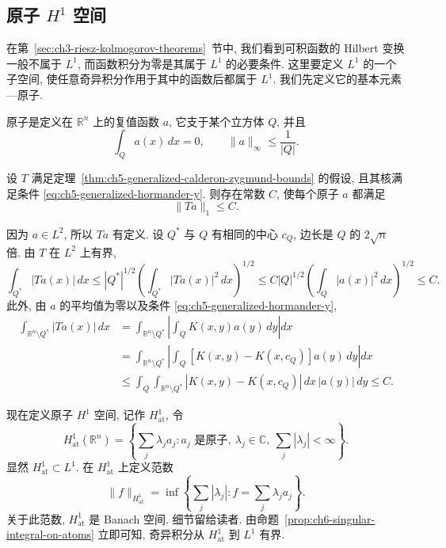 \hypertarget{chapter-06-page-127}{}
\subsection{原子 $H^1$ 空间}
\label{sec:ch6-atomic-h1}

在第~\ref{sec:ch3-riesz-kolmogorov-theorems}~节中, 我们看到可积函数的 Hilbert 变换一般不属于 $L^1$, 而函数积分为零是其属于 $L^1$ 的必要条件. 这里要定义 $L^1$ 的一个子空间, 使任意奇异积分作用于其中的函数后都属于 $L^1$. 我们先定义它的基本元素---原子.

\begin{Definition}
\label{def:ch6-atom}
原子是定义在 $\mathbb R^n$ 上的复值函数 $a$, 它支于某个立方体 $Q$, 并且
\[
 \int_Qa(x)\,dx=0,
 \qquad
 \|a\|_\infty\le\frac1{|Q|}.
\]
\end{Definition}

\begin{Proposition}
\label{prop:ch6-singular-integral-on-atoms}
设 $T$ 满足定理~\ref{thm:ch5-generalized-calderon-zygmund-bounds} 的假设, 且其核满足条件 \eqref{eq:ch5-generalized-hormander-y}. 则存在常数 $C$, 使每个原子 $a$ 都满足
\[
 \|Ta\|_1\le C.
\]
\end{Proposition}

\begin{Proof}
因为 $a\in L^2$, 所以 $Ta$ 有定义. 设 $Q^*$ 与 $Q$ 有相同的中心 $c_Q$, 边长是 $Q$ 的 $2\sqrt n$ 倍. 由 $T$ 在 $L^2$ 上有界,
\[
 \int_{Q^*}|Ta(x)|\,dx
 \le |Q^*|^{1/2}\left(\int_{Q^*}|Ta(x)|^2\,dx\right)^{1/2}
 \le C|Q|^{1/2}\left(\int_Q|a(x)|^2\,dx\right)^{1/2}
 \le C.
\]
此外, 由 $a$ 的平均值为零以及条件 \eqref{eq:ch5-generalized-hormander-y},
\[
\begin{aligned}
 \int_{\mathbb R^n\setminus Q^*}|Ta(x)|\,dx
 &=\int_{\mathbb R^n\setminus Q^*}
   \left|\int_QK(x,y)a(y)\,dy\right|dx\\
 &=\int_{\mathbb R^n\setminus Q^*}
   \left|\int_Q[K(x,y)-K(x,c_Q)]a(y)\,dy\right|dx\\
 &\le\int_Q\int_{\mathbb R^n\setminus Q^*}
   |K(x,y)-K(x,c_Q)|\,dx\,|a(y)|\,dy
 \le C.
\end{aligned}
\]
\end{Proof}

\hypertarget{chapter-06-page-128}{}
现在定义原子 $H^1$ 空间, 记作 $H^1_{\mathrm{at}}$, 令
\[
 H^1_{\mathrm{at}}(\mathbb R^n)
 =\left\{\sum_j\lambda_ja_j:
 a_j\text{ 是原子},\ \lambda_j\in\mathbb C,\ \sum_j|\lambda_j|<\infty\right\}.
\]
显然 $H^1_{\mathrm{at}}\subset L^1$. 在 $H^1_{\mathrm{at}}$ 上定义范数
\[
 \|f\|_{H^1_{\mathrm{at}}}
 =\inf\left\{\sum_j|\lambda_j|:f=\sum_j\lambda_ja_j\right\}.
\]
关于此范数, $H^1_{\mathrm{at}}$ 是 Banach 空间. 细节留给读者. 由命题~\ref{prop:ch6-singular-integral-on-atoms} 立即可知, 奇异积分从 $H^1_{\mathrm{at}}$ 到 $L^1$ 有界.

